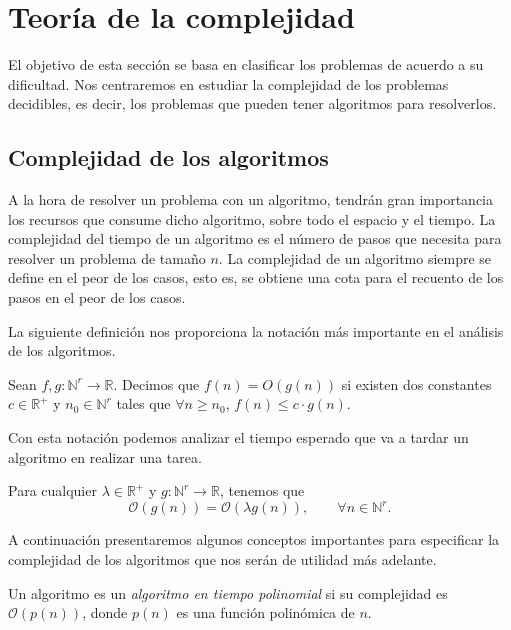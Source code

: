\section{Teoría de la complejidad}

El objetivo de esta sección se basa en clasificar los problemas de acuerdo a su dificultad. Nos centraremos en estudiar la complejidad de los problemas decidibles, es decir, los problemas que pueden tener algoritmos para resolverlos.

\subsection{Complejidad de los algoritmos}

A la hora de resolver un problema con un algoritmo, tendrán gran importancia los recursos que consume dicho algoritmo, sobre todo el espacio y el tiempo. La complejidad del tiempo de un algoritmo es el número de pasos que necesita para resolver un problema de tamaño $n$. La complejidad de un algoritmo siempre se define en el peor de los casos, esto es, se obtiene una cota para el recuento de los pasos en el peor de los casos. 

La siguiente definición nos proporciona la notación más importante en el análisis de los algoritmos.

\begin{definition}
    Sean $f, g : \mathbb{N}^r \longrightarrow \mathbb{R}$. Decimos que $f(n) = O(g(n))$ si existen dos constantes $c \in \mathbb{R}^+$ y $n_0 \in \mathbb{N}^r$ tales que $\forall n \geq n_0$, $f(n) \leq c \cdot g(n)$.
\end{definition}

Con esta notación podemos analizar el tiempo esperado que va a tardar un algoritmo en realizar una tarea.

\begin{proposition}
    Para cualquier $\lambda \in \mathbb{R}^+$ y $g : \mathbb{N}^r \longrightarrow \mathbb{R}$, tenemos que
    \[
        \mathcal{O}(g(n)) = \mathcal{O}(\lambda g(n)), \qquad \forall n \in \mathbb{N}^r.
    \]
\end{proposition}

A continuación presentaremos algunos conceptos importantes para especificar la complejidad de los algoritmos que nos serán de utilidad más adelante.

\begin{definition}
    Un algoritmo es un \emph{algoritmo en tiempo polinomial} si su complejidad es $\mathcal{O}(p(n))$, donde $p(n)$ es una función polinómica de $n$.
\end{definition}

